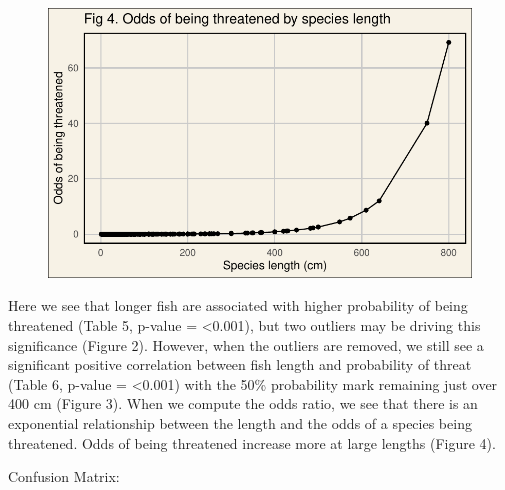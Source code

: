 \documentclass[
  letterpaper,
  DIV=11,
  numbers=noendperiod]{scrartcl}
\begin{document}
\begin{figure}[H]

{\centering \includegraphics{pdf_files/figure-pdf/unnamed-chunk-9-1.pdf}

}

\end{figure}

Here we see that longer fish are associated with higher probability of
being threatened (Table 5, p-value = \textless0.001), but two outliers
may be driving this significance (Figure 2). However, when the outliers
are removed, we still see a significant positive correlation between
fish length and probability of threat (Table 6, p-value =
\textless0.001) with the 50\% probability mark remaining just over 400
cm (Figure 3). When we compute the odds ratio, we see that there is an
exponential relationship between the length and the odds of a species
being threatened. Odds of being threatened increase more at large
lengths (Figure 4).

Confusion Matrix:
\end{document}

